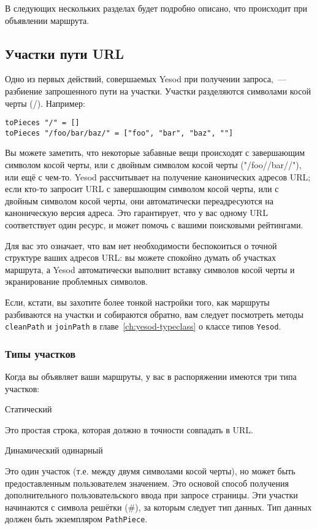 В следующих нескольких разделах будет подробно описано, что происходит
при объявлении маршрута.

\subsection{Участки пути URL}
Одно из первых действий, совершаемых Yesod при получении запроса,~---
разбиение запрошенного пути на участки.  Участки разделяются символами
косой черты (/). Например:
\begin{lstlisting}
toPieces "/" = []
toPieces "/foo/bar/baz/" = ["foo", "bar", "baz", ""]
\end{lstlisting}

Вы можете заметить, что некоторые забавные вещи происходят с
завершающим символом косой черты, или с двойным символом косой черты
("/foo//bar//"), или ещё с чем-то. Yesod рассчитывает на получение
канонических адресов URL; если кто-то запросит URL с завершающим
символом косой черты, или с двойным символом косой черты, они
автоматически переадресуются на каноническую версия адреса. Это
гарантирует, что у вас одному URL соответствует один ресурс, и может
помочь с вашими поисковыми рейтингами.

Для вас это означает, что вам нет необходимости беспокоиться о точной
структуре ваших адресов URL: вы можете спокойно думать об участках
маршрута, а Yesod автоматически выполнит вставку символов косой черты
и экранирование проблемных символов.

Если, кстати, вы захотите более тонкой настройки того, как маршруты
разбиваются на участки и собираются обратно, вам следует посмотреть
методы \lstinline!cleanPath! и \lstinline!joinPath! в главе~\ref{ch:yesod-typeclass}
о классе типов \lstinline!Yesod!.

\subsubsection{Типы участков}
Когда вы объявляет ваши маршруты, у вас в распоряжении имеются три
типа участков:

Статический

Это простая строка, которая должно в точности совпадать в URL.

Динамический одинарный

Это один участок (т.е. между двумя символами косой черты), но может
быть предоставленным пользователем значением. Это основой способ
получения дополнительного пользовательского ввода при запросе
страницы. Эти участки начинаются с символа решётки (\#), за которым
следует тип данных. Тип данных должен быть экземпляром
\lstinline!PathPiece!.


